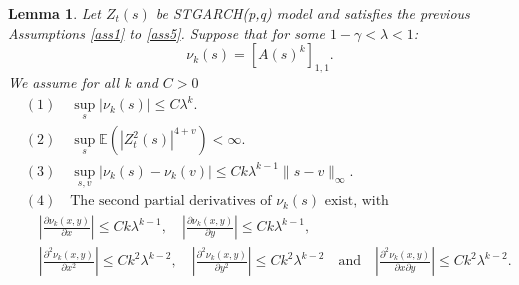 \documentclass[fleqn,11pt]{article}
\newtheorem{lemmaB}{Lemma}[section]
\begin{document}
\begin{lemmaB}\label{lem}
Let $Z_t(s)$ be  STGARCH(p,q) model  and satisfies the previous Assumptions \ref{ass1} to \ref{ass5}. Suppose that for some $1-\gamma<\lambda<1$: $$\nu_k(s) =  [A(s)^k]_{1,1}.$$  We assume for all k and $ C > 0$
\begin{align*}
&(1) \quad \sup_{s} |\nu_k(s)| \leq C \lambda^k. \\
&(2) \quad \sup_s \mathbb{E}(|Z_t^2(s)|^{4 + v}) < \infty. \\
&(3) \quad \sup_{s,v} |\nu_k(s) - \nu_k(v)| \leq C k \lambda^{k-1} \|s - v\|_{\infty}. \\
&(4) \quad \text{The second partial derivatives of } \nu_k(s)  \text{ exist, with} \\
&\quad \left| \frac{\partial \nu_k(x,y)}{\partial x } \right| \leq C k \lambda^{k-1}, \quad 
\left| \frac{\partial \nu_k(x,y)}{\partial y } \right| \leq Ck \lambda^{k-1}, \\
&\quad \left| \frac{\partial^2 \nu_k(x,y)}{\partial x^2} \right| \leq Ck^2 \lambda^{k-2}, \quad \left| \frac{\partial^2 \nu_k(x,y)}{\partial y^2} \right| \leq Ck^2 \lambda^{k-2} \quad \text{and} \quad \left| \frac{\partial^2 \nu_k(x,y)}{\partial x \partial y} \right| \leq Ck^2 \lambda^{k-2}.
\end{align*}
\end{lemmaB}
\end{document}

